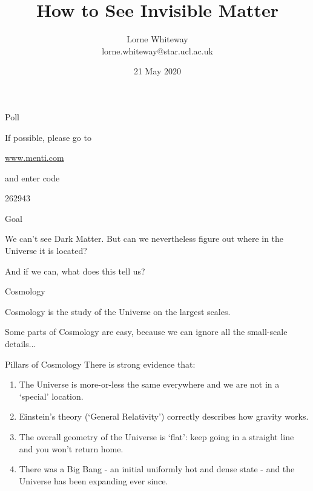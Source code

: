 \documentclass[usenames,dvipsnames]{beamer}
\title{How to See Invisible Matter}
\author{Lorne Whiteway \\ lorne.whiteway@star.ucl.ac.uk}
\institute{Astrophysics Group \\ Department of Physics and Astronomy \\ University College London}
\date{21 May 2020}
\begin{document}
\frame{\titlepage}


\begin{frame}{Poll}
  \begin{block}{}
    If possible, please go to\\
    \begin{center}
    \huge \alert{\url{www.menti.com}}\\
    \end{center}
    and enter code\\
    \begin{center}
    \huge 262943
    \end{center}
  \end{block}
\end{frame}

\begin{frame}{Goal}
  \begin{block}{}
    We can't see Dark Matter. But can we nevertheless figure out where in the Universe it is located?
  \end{block}
  \begin{block}{}
    And if we can, what does this tell us?
  \end{block}
\end{frame}

\begin{frame}{Cosmology}
  \begin{block}{}
    Cosmology is the study of the Universe on the largest scales.
  \end{block}
  \begin{block}{}
    Some parts of Cosmology are easy, because we can ignore all the small-scale details...
  \end{block}
\end{frame}

\begin{frame}{Pillars of Cosmology}
  There is strong evidence that:
  \begin{block}{}
    \begin{enumerate}
      \item{The Universe is more-or-less the same everywhere and we are not in a `special' location.}
      \item{Einstein's theory (`General Relativity') correctly describes how gravity works.}
      \item{The overall geometry of the Universe is `flat': keep going in a straight line and you won't return home.}
      \item{There was a Big Bang - an initial uniformly hot and dense state - and the Universe has been expanding ever since.}
    \end{enumerate}
  \end{block}
\end{frame}
\end{document}
